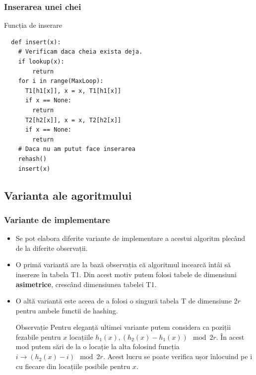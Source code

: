 \documentclass{beamer}
\begin{document}
\begin{frame}[fragile]
\frametitle{Inserarea unei chei}
\begin{block}{Funcția de inserare}
\begin{lstlisting}
  def insert(x):
  	# Verificam daca cheia exista deja.
  	if lookup(x):
  		return
   	for i in range(MaxLoop):
   	  T1[h1[x]], x = x, T1[h1[x]]
   	  if x == None:
   	    return
   	  T2[h2[x]], x = x, T2[h2[x]]
   	  if x == None:
   	    return
   	# Daca nu am putut face inserarea
   	rehash()
   	insert(x)
\end{lstlisting}
\end{block}

\end{frame}
\begin{frame}
\subsection{Varianta ale agoritmului}
\frametitle{Variante de implementare}
\begin{itemize}
\item Se pot elabora diferite variante de implementare a acestui algoritm plecând de la diferite observații.

\item O primă variantă are la bază observația că algoritmul incearcă întâi să insereze în tabela T1. Din acest motiv putem folosi tabele de dimensiuni \textbf{asimetrice}, crescând dimensiunea tabelei T1.

\item O altă variantă este aceea de a folosi o singură tabela T de dimensiune $2r$ pentru ambele functii de hashing.

\begin{block}{Observație}
Pentru eleganță ultimei variante putem considera ca poziții fezabile pentru $x$ locațiile $h_1(x), (h_2(x) - h_1(x)) \mod 2r$. În acest mod putem sări de la o locație la alta folosind funcția $i \to (h_2(x) - i) \mod 2r$. Acest lucru se poate verifica ușor înlocuind pe i cu fiecare din locațiile posibile pentru $x$.
\end{block}

\end{itemize}
\end{frame}
\end{document}
